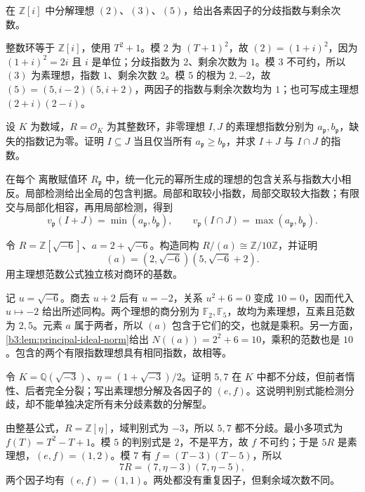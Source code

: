 \begin{exercise}\label{b3:ex:A-gaussian-primes}
	在 \(\mathbb Z[i]\) 中分解理想 \((2)\)、\((3)\)、\((5)\)，给出各素因子的分歧指数与剩余次数。
\end{exercise}
\begin{solution}
	整数环等于 \(\mathbb Z[i]\)，使用 \(T^2+1\)。模 \(2\) 为 \((T+1)^2\)，故 \((2)=(1+i)^2\)，因为 \((1+i)^2=2i\) 且 \(i\) 是单位；分歧指数为 \(2\)、剩余次数为 \(1\)。模 \(3\) 不可约，所以 \((3)\) 为素理想，指数 \(1\)、剩余次数 \(2\)。模 \(5\) 的根为 \(2,-2\)，故 \((5)=(5,i-2)(5,i+2)\)，两因子的指数与剩余次数均为 \(1\)；也可写成主理想 \((2+i)(2-i)\)。
\end{solution}

\begin{exercise}\label{b3:ex:A-ideal-containment}
	设 \(K\) 为数域，\(R=\mathcal O_K\) 为其整数环，非零理想 \(I,J\) 的素理想指数分别为 \(a_{\mathfrak p},b_{\mathfrak p}\)，缺失的指数记为零。证明 \(I\subseteq J\) 当且仅当所有 \(a_{\mathfrak p}\ge b_{\mathfrak p}\)，并求 \(I+J\) 与 \(I\cap J\) 的指数。
\end{exercise}
\begin{solution}
	在每个 离散赋值环 \(R_{\mathfrak p}\) 中，统一化元的幂所生成的理想的包含关系与指数大小相反。局部检测给出全局的包含判据。局部和取较小指数，局部交取较大指数；有限交与局部化相容，再用局部检测，得到
	\[
		v_{\mathfrak p}(I+J)=\min(a_{\mathfrak p},b_{\mathfrak p}),\qquad v_{\mathfrak p}(I\cap J)=\max(a_{\mathfrak p},b_{\mathfrak p}).
	\]
\end{solution}

\begin{exercise}\label{b3:ex:A-principal-norm}
	令 \(R=\mathbb Z[\sqrt{-6}]\)、\(a=2+\sqrt{-6}\)。构造同构 \(R/(a)\cong\mathbb Z/10\mathbb Z\)，并证明
	\[
		(a)=(2,\sqrt{-6})(5,\sqrt{-6}+2).
	\]
	用主理想范数公式独立核对商环的基数。
\end{exercise}
\begin{solution}
	记 \(u=\sqrt{-6}\)。商去 \(u+2\) 后有 \(u=-2\)，关系 \(u^2+6=0\) 变成 \(10=0\)，因而代入 \(u\mapsto-2\) 给出所述同构。两个理想的商分别为 \(\mathbb F_2,\mathbb F_5\)，故均为素理想，互素且范数为 \(2,5\)。元素 \(a\) 属于两者，所以 \((a)\) 包含于它们的交，也就是乘积。另一方面，\cref{b3:lem:principal-ideal-norm}给出 \(N((a))=2^2+6=10\)，乘积的范数也是 \(10\)。包含的两个有限指数理想具有相同指数，故相等。
\end{solution}

\begin{exercise}\label{b3:ex:A-discriminant-primes}
	令 \(K=\mathbb Q(\sqrt{-3})\)、\(\eta=(1+\sqrt{-3})/2\)。证明 \(5,7\) 在 \(K\) 中都不分歧，但前者惰性、后者完全分裂；写出素理想分解及各因子的 \((e,f)\)。这说明判别式能检测分歧，却不能单独决定所有未分歧素数的分解型。
\end{exercise}
\begin{solution}
	由整基公式，\(R=\mathbb Z[\eta]\)，域判别式为 \(-3\)，所以 \(5,7\) 都不分歧。最小多项式为 \(f(T)=T^2-T+1\)。模 \(5\) 的判别式是 \(2\)，不是平方，故 \(f\) 不可约；于是 \(5R\) 是素理想，\((e,f)=(1,2)\)。模 \(7\) 有 \(f=(T-3)(T-5)\)，所以
	\[
		7R=(7,\eta-3)(7,\eta-5),
	\]
	两个因子均有 \((e,f)=(1,1)\)。两处都没有重复因子，但剩余域次数不同。
\end{solution}

